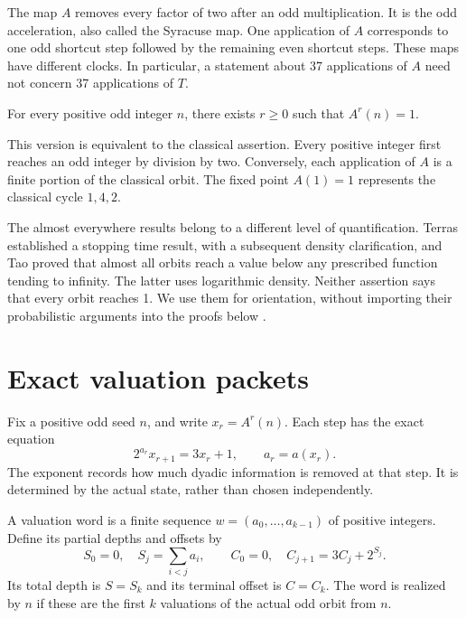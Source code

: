 The map $A$ removes every factor of two after an odd multiplication. It is the odd acceleration, also called the Syracuse map. One application of $A$ corresponds to one odd shortcut step followed by the remaining even shortcut steps. These maps have different clocks. In particular, a statement about 37 applications of $A$ need not concern 37 applications of $T$.

\begin{conjecture}[Collatz]\label{conj:collatz}
For every positive odd integer $n$, there exists $r\ge0$ such that $A^r(n)=1$.
\end{conjecture}

This version is equivalent to the classical assertion. Every positive integer first reaches an odd integer by division by two. Conversely, each application of $A$ is a finite portion of the classical orbit. The fixed point $A(1)=1$ represents the classical cycle $1,4,2$.

The almost everywhere results belong to a different level of quantification. Terras established a stopping time result, with a subsequent density clarification, and Tao proved that almost all orbits reach a value below any prescribed function tending to infinity. The latter uses logarithmic density. Neither assertion says that every orbit reaches 1. We use them for orientation, without importing their probabilistic arguments into the proofs below \cite{terras1976,terras1979,tao2026}.

\section{Exact valuation packets}
Fix a positive odd seed $n$, and write $x_r=A^r(n)$. Each step has the exact equation
\begin{equation}\label{eq:onestep}
2^{a_r}x_{r+1}=3x_r+1,\qquad a_r=a(x_r).
\end{equation}
The exponent records how much dyadic information is removed at that step. It is determined by the actual state, rather than chosen independently.

\begin{definition}\label{def:word}
A valuation word is a finite sequence $w=(a_0,\ldots,a_{k-1})$ of positive integers. Define its partial depths and offsets by
\begin{equation}\label{eq:offsetrec}
S_0=0,\quad S_j=\sum_{i<j}a_i,\qquad
C_0=0,\quad C_{j+1}=3C_j+2^{S_j}.
\end{equation}
Its total depth is $S=S_k$ and its terminal offset is $C=C_k$. The word is realized by $n$ if these are the first $k$ valuations of the actual odd orbit from $n$.
\end{definition}

